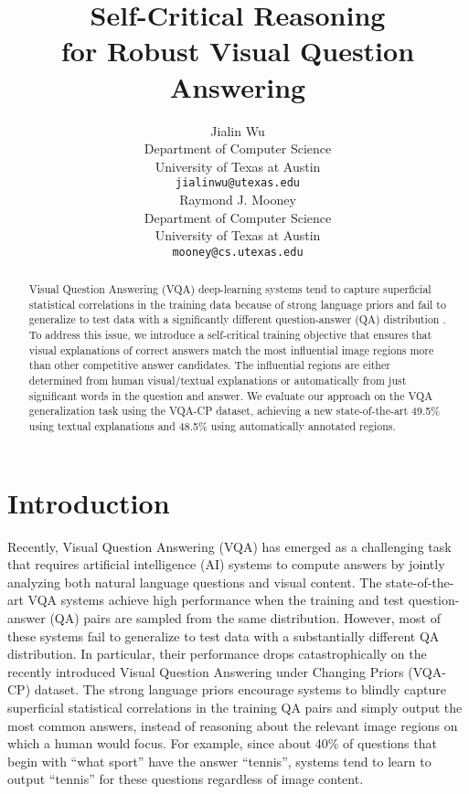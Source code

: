 \documentclass{article}
\title{Self-Critical Reasoning \\ for Robust Visual Question Answering}
\author{
Jialin Wu \\
   Department of Computer Science\\
   University of Texas at Austin\\
  \texttt{jialinwu@utexas.edu} \\
   \And
   Raymond J. Mooney \\
   Department of Computer Science\\
   University of Texas at Austin\\
   \texttt{mooney@cs.utexas.edu} \\
}
\begin{document}
\maketitle

\begin{abstract}
Visual Question Answering (VQA) deep-learning systems tend to capture superficial statistical correlations in the training data because of strong language priors and fail to generalize to test data with a significantly different question-answer (QA) distribution \cite{vqa-cp}. To address this issue, we introduce a self-critical training objective that ensures that visual explanations of correct answers match the most influential image regions more than other competitive answer candidates. The influential regions are either determined from human visual/textual explanations or automatically from just significant words in the question and answer. We evaluate our approach on the VQA generalization task using the VQA-CP dataset, achieving a new state-of-the-art  49.5\% using textual explanations and 48.5\% using automatically annotated regions.

\end{abstract}

\section{Introduction}
Recently, Visual Question Answering (VQA) \cite{antol2015vqa} has emerged as a challenging task that requires artificial intelligence (AI) systems to compute answers by jointly analyzing both natural language questions and visual content. The state-of-the-art VQA systems \cite{fukui2016multimodal,anderson2017bottom,vqa-cp,andreas2016neural,hu2018explainable,yang2016stacked,selvaraju2019taking,wu2019generating,jiang2018pythia,kim2018bilinear,ramakrishnan2018overcoming} achieve high performance when the training and test question-answer (QA) pairs are sampled from the same distribution. However, most of these systems fail to generalize to test data with a substantially different QA distribution. In particular, their performance drops catastrophically on the recently introduced Visual Question Answering under Changing Priors (VQA-CP) \cite{vqa-cp} dataset. The strong language priors encourage systems to blindly capture superficial statistical correlations in the training QA pairs and simply output the most common answers, instead of reasoning about the relevant image regions on which a human would focus. For example, since about 40\% of questions that begin with ``what sport'' have the answer ``tennis'', systems tend to learn to output ``tennis'' for these questions regardless of image content. 
\end{document}
